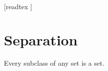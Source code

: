 \documentclass[10pt]{article}
\begin{document}
  \begin{imports}
    \begin{forthel}
      [readtex ]
    \end{forthel}
  \end{imports}


  \section{Separation}

  \begin{forthel}
    \begin{axiom}
      Every subclass of any set is a set.
    \end{axiom}
  \end{forthel}
\end{document}
